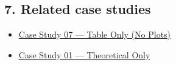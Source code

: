 \documentclass[
  11pt,
]{article}
\providecommand{\tightlist}{
  \setlength{\itemsep}{0pt}\setlength{\parskip}{0pt}}
\begin{document}
\hypertarget{7-related-case-studies}{
\subsection{7. Related case studies}\label{7-related-case-studies}}

\begin{itemize}
\tightlist
\item
  \href{https://github.com/pinarsyt/overlap-calculator/blob/main/case_studies/07_table_only/README.md}{Case
  Study 07 --- Table Only (No Plots)}
\item
  \href{https://github.com/pinarsyt/overlap-calculator/blob/main/case_studies/01_theoretical_only/README.md}{Case
  Study 01 --- Theoretical Only}
\end{itemize}
\end{document}
